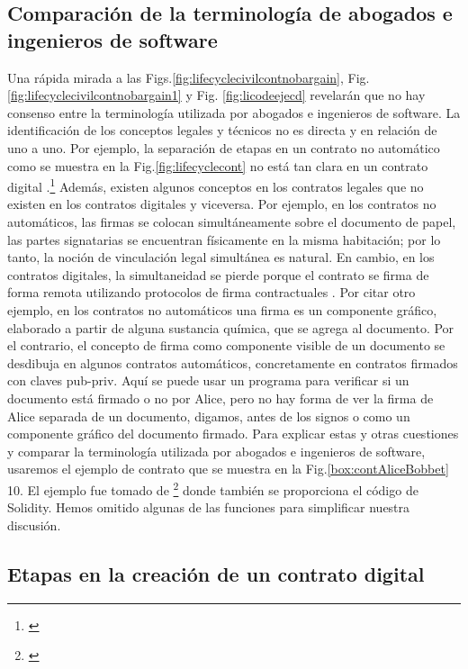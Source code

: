 \documentclass[12pt]{report} %
\begin{document}
 \subsection{Comparación de la terminología de abogados e ingenieros de software}

    Una rápida mirada a las Figs.\ref{fig:lifecyclecivilcontnobargain}, Fig. \ref{fig:lifecyclecivilcontnobargain1} y Fig. \ref{fig:licodeejecd} revelarán que no hay consenso entre la terminología utilizada por abogados e ingenieros de software. La identificación de los conceptos legales y técnicos no es directa y en relación de uno a uno. Por ejemplo, la separación de etapas en un contrato no automático como se muestra en la Fig.\ref{fig:lifecyclecont}  no está tan clara en un contrato digital .\footnote{\cite{Riikka2016}} Además, existen algunos conceptos en los contratos legales que no existen en los contratos digitales y viceversa. Por ejemplo, en los contratos no automáticos, las firmas se colocan simultáneamente sobre el documento de papel, las partes signatarias se encuentran físicamente en la misma habitación; por lo tanto, la noción de vinculación legal simultánea es natural. En cambio, en los contratos digitales, la simultaneidad se pierde porque el contrato se firma de forma remota utilizando protocolos de firma contractuales . Por citar otro ejemplo, en los contratos no automáticos una firma es un componente gráfico, elaborado a partir de alguna sustancia química, que se agrega al documento. Por el contrario, el concepto de firma como componente visible de un documento se desdibuja en algunos contratos automáticos, concretamente en contratos firmados con claves pub-priv. Aquí se puede usar un programa para verificar si un documento está firmado o no por Alice, pero no hay forma de ver la firma de Alice separada de un documento, digamos, antes de los signos o como un componente gráfico del documento firmado. Para explicar estas y otras cuestiones y comparar la terminología utilizada por abogados e ingenieros de software, usaremos el ejemplo de contrato que se muestra en la Fig.\ref{box:contAliceBobbet}  10. El ejemplo fue tomado de \footnote{\cite{Riikka2016}} donde también se proporciona el código de Solidity. Hemos omitido algunas de las funciones para simplificar nuestra discusión. 

\subsection{Etapas en la creación de un contrato digital}
\label{Pasosformacioncontratodigital}
\end{document}
